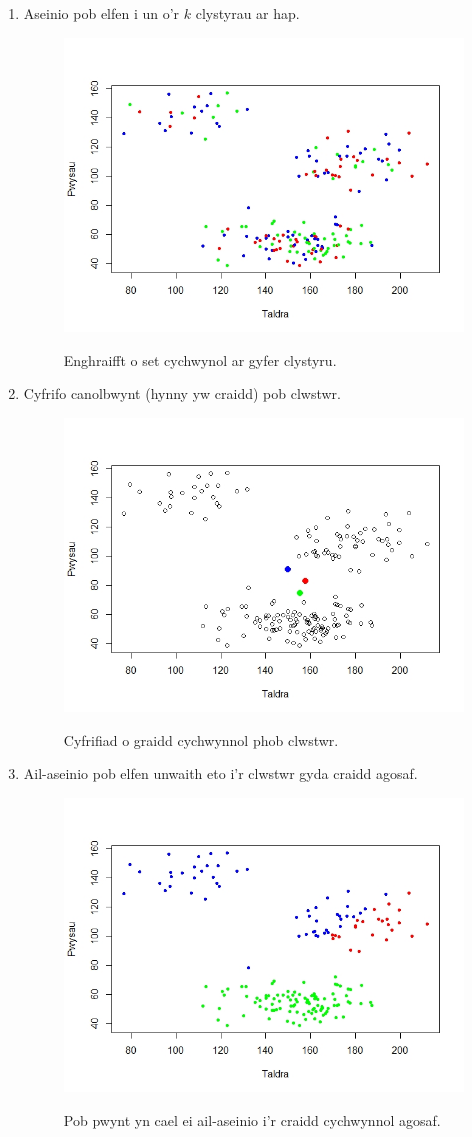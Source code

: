 \begin{enumerate}
\item Aseinio pob elfen i un o'r $k$ clystyrau ar hap.

\begin{figure}[H]
\begin{center}
\includegraphics[width=0.5\linewidth]{../img/Cam1.jpeg}
\label{fig:Enghraifft_o_set_cychwynol}
\caption{Enghraifft o set cychwynol ar gyfer clystyru.}
\end{center}
\end{figure}

\item Cyfrifo canolbwynt (hynny yw craidd) pob clwstwr.

\begin{figure}[H]
\begin{center}
\includegraphics[width=0.5\linewidth]{../img/ClystyrauCychwynol.jpeg}
\label{fig:Craidd_pob_clwstwr}
\caption{Cyfrifiad o graidd cychwynnol phob clwstwr.}
\end{center}
\end{figure}

\item Ail-aseinio pob elfen unwaith eto i'r clwstwr gyda craidd agosaf.

\begin{figure}[H]
\begin{center}
\includegraphics[width=0.5\linewidth]{../img/Cam3.jpeg}
\label{fig:ail-aseinio-set}
\caption{Pob pwynt yn cael ei ail-aseinio i'r craidd cychwynnol agosaf.}
\end{center}
\end{figure}


\end{enumerate}
